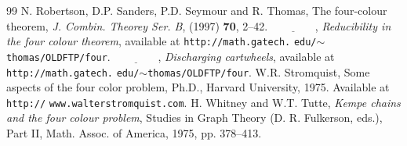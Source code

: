 \documentclass[11pt]{article}
\begin{document}
\begin{thebibliography}{99}
 N. Robertson, D.P. Sanders, P.D. Seymour and R. Thomas, The four-colour theorem, \emph{J. Combin. Theorey Ser. B}, (1997) \textbf{70}, 2--42.
 $\underline{\qquad\qquad}$, \emph{Reducibility in the four colour theorem}, available at \texttt{http://math.gatech.} \texttt{edu/}\texttt{$\sim$thomas/OLDFTP/four}.
 $\underline{\qquad\qquad}$, \emph{Discharging cartwheels}, available at \texttt{http://math.gatech.} \texttt{edu/}\texttt{$\sim$thomas/OLDFTP/}\texttt{four}.
 W.R. Stromquist, Some aspects of the four color problem, Ph.D., Harvard University, 1975. Available at \texttt{http://} \texttt{www.walterstromquist.com}.
 H. Whitney and W.T. Tutte, \emph{Kempe chains and the four colour problem}, Studies in Graph Theory (D. R. Fulkerson, eds.), Part II, Math. Assoc. of America, 1975, pp. 378--413.
\end{thebibliography}
\end{document}
